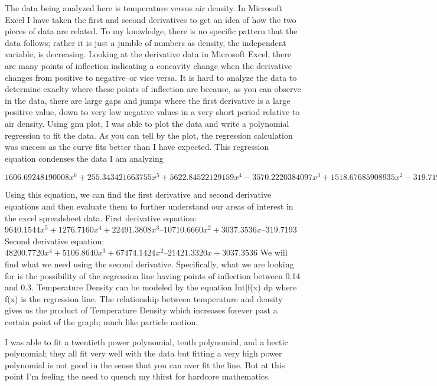 \documentclass{article}
\begin{document}
The data being analyzed here is temperature versus air density. In Microsoft Excel I have taken the first and second derivatives to get an idea of how the two pieces of data are related. To my knowledge, there is no specific pattern that the data follows; rather it is just a jumble of numbers as density, the independent variable, is decreasing.
Looking at the derivative data in Microsoft Excel, there are many points of inflection indicating a concavity change when the derivative changes from positive to negative--or vice versa. It is hard to analyze the data to determine exaclty where these points of inflection are because, as you can observe in the data, there are large gaps and jumps where the first derivative is a large positive value, down to very low negative values in a very short period relative to air density. Using gnu plot, I was able to plot the data and write a polynomial regression to fit the data. As you can tell by the plot, the regression calculation was success as the curve fits better than I have expected. This regression equation condenses the data I am analyzing

\begin{dmath*}
  1606.69248190008x^6 + 255.343421663755x^5 + 5622.84522129159x^4 -3570.2220384097x^3 + 1518.67685908935x^2 -319.719301948874x +235.092280725325
\end{dmath*}

Using this equation, we can find the first derivative and second derivative equations and then evaluate them to further understand our areas of interest in the excel spreadsheet data.
First derivative equation: $9640.1544x^5 + 1276.7160x^4 + 22491.3808x^3 – 10710.6660x^2 + 3037.3536x – 319.7193$
Second derivative equation: $48200.7720x^4 + 5106.8640x^3 + 67474.1424x^2 – 21421.3320x + 3037.3536$
We will find what we need using the second derivative. Specifically, what we are looking for is the possibility of the regression line having points of inflection between 0.14 and 0.3.
Temperature Density can be modeled by the equation Int|f(x) dp where f(x) is the regression line. The relationship between temperature and density gives us the product of Temperature Density which increases forever past a certain point of the graph; much like particle motion.

I was able to fit a twentieth power polynomial, tenth polynomial, and a hectic polynomial; they all fit very well with the data but fitting a very high power polynomial is not good in the sense that you can over fit the line. But at this point I’m feeling the need to quench my thirst for hardcore mathematics.
\end{document}
